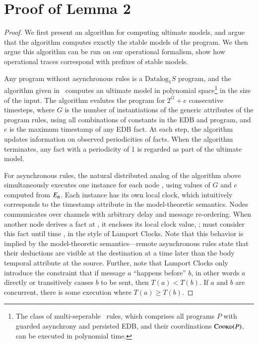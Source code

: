 \section{Proof of Lemma 2}
\begin{proof}
We first present an algorithm for computing ultimate models, and argue that the algorithm computes exactly the stable models of the \lang program.  We then argue this algorithm can be run on our operational formalism, show how operational traces correspond with prefixes of stable models.

Any \lang program without asynchronous rules is a $\text{Datalog}_1S$ program, and the algorithm given in~\cite{tdd} computes an ultimate model in polynomial space\footnote{The class of multi-seperable~\cite{tdd-poly} \lang rules, which comprises all \lang programs $P$ with guarded asynchrony and persisted EDB, and their coordinations $\textsc{Coord}(P)$, can be executed in polynomial time.} in the size of the input.  The algorithm evalutes the program for $2^G + e$ consecutive timesteps, where $G$ is the number of instantiations of the generic attributes of the program rules, using all combinations of constants in the EDB and program, and $e$ is the maximum timestamp of any EDB fact.  At each step, the algorithm updates information on observed periodicities of facts.  When the algorithm terminates, any fact with a periodicity of 1 is regarded as part of the ultimate model.

For asynchronous rules, the natural distributed analog of the algorithm above simultaneously executes one instance for each node , using values of $G$ and $e$ computed from $E_{\text{\dedalus{{\scriptsize n}}}}$.  Each instance has its own local clock, which intuitively corresponds to the timestamp attribute in the model-theoretic semantics.  Nodes communicates over channels with arbitrary delay and message re-ordering.  When another node  derives a fact at , it encloses its local clock value, ;  must consider this fact until time , in the style of Lamport Clocks.  Note that this behavior is implied by the model-theoretic semantics---remote asynchronous rules state that their deductions are visible at the destination at a time later than the body temporal attribute at the source.  Further, note that Lamport Clocks only introduce the constraint that if message $a$ ``happens before'' $b$, in other words $a$ directly or transitively causes $b$ to be sent, then $T(a) < T(b)$.  If $a$ and $b$ are concurrent, there is some execution where $T(a) \geq T(b)$.


\end{proof}
